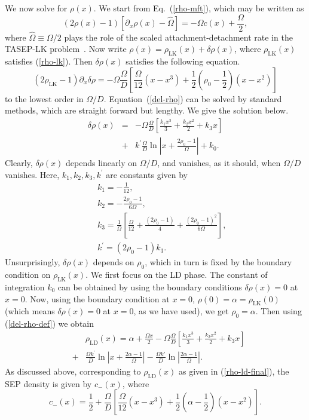 \documentclass[aps,pre,twocolumn,superscriptaddress,amsmath,amssymb,longbibliography,floatfix,nofootinbib]{revtex4}
\begin{document}
{We now solve for $\rho(x)$. We start from Eq.~(\ref{rho-mft}), which may be written as 
\begin{equation}
 (2\rho(x)-1)[{\partial}_x\rho(x)-\hat\Omega]=-\Omega c(x) +\frac{\Omega}{2},
\end{equation}
{ where $\hat\Omega \equiv \Omega/2$ plays the role of the scaled attachment-detachment rate in the TASEP-LK problem~\cite{frey-lktasep}}. Now write $\rho(x)=\rho_\text{LK}(x)+\delta\rho(x)$, where $\rho_\text{LK}(x)$ satisfies (\ref{rho-lk}). Then $\delta\rho(x)$ satisfies the following equation.
\begin{equation}
(2\rho_\text{LK}-1){\partial}_x\delta\rho=-\Omega\frac{\Omega}{D} \left[\frac{\Omega}{12}(x-x^3)+\frac{1}{2}(\rho_0-\frac{1}{2})(x-x^2)\right] \label{del-rho}
\end{equation}
to the lowest order in $\Omega/D$. Equation~(\ref{del-rho}) can be solved by standard methods, which are straight forward but lengthy. We give the solution below.
\begin{eqnarray}
 \delta\rho(x)&=&-\Omega\frac{\Omega}{D}\left[\frac{k_1x^3}{3}+\frac{k_2x^2}{2}+k_3x\right]\nonumber \\&+&k^\prime\frac{\Omega}{D}\ln \left|x+\frac{2\rho_0-1}{\Omega}\right| + k_0.\label{delta-rho-basic}
\end{eqnarray}
Clearly, $\delta\rho(x)$ depends linearly on $\Omega/D$, and vanishes, as it should, when $\Omega/D$ vanishes. Here, $k_1,k_2,k_3,k^\prime$ are constants given by
\begin{eqnarray}
 &&k_1=-\frac{1}{12},\\
 &&k_2=-\frac{2\rho_0-1}{6\Omega},\\
 &&k_3=\frac{1}{\Omega} \left[\frac{\Omega}{12}+\frac{(2\rho_0-1)}{4}+\frac{(2\rho_0-1)^2}{6\Omega}\right],\\
 &&k^\prime=(2\rho_0-1)k_3.
\end{eqnarray}
Unsurprisingly, $\delta \rho(x)$ depends on $\rho_0$, which in turn is fixed by the boundary condition on $\rho_\text{LK}(x)$. We first focus on the LD phase. The constant of integration $k_0$ can be obtained by using the boundary conditions  $\delta\rho(x)=0$ at $x=0$. Now,
using the boundary condition at $x=0$, $\rho(0)=\alpha=\rho_\text{LK}(0)$ (which means $\delta\rho(x)=0$ at $x=0$, as we have used), we get $\rho_0=\alpha$. Then using (\ref{del-rho-def}) we obtain
\begin{eqnarray}
 &&\rho_\text{LD}(x)=\alpha +\frac{\Omega x}{2}-\Omega\frac{\Omega}{D}\left[\frac{k_1x^3}{3}+\frac{k_2x^2}{2}+k_3x \right]\nonumber \\&+&\frac{\Omega k^\prime}{D}\ln \left|x+\frac{2\alpha-1}{\Omega}\right|-\frac{\Omega k'}{D}\ln \left|\frac{2\alpha-1}{\Omega}\right|.\label{rho-ld-final}
 \end{eqnarray}
 As discussed above, corresponding to $\rho_\text{LD}(x)$ as given in (\ref{rho-ld-final}), the SEP density is given by $c_-(x)$, where
\begin{equation}
 c_-(x)= \frac{1}{2} + \frac{\Omega}{D}\left[\frac{\Omega}{12}(x-x^3)+\frac{1}{2}(\alpha-\frac{1}{2})(x-x^2)\right].\label{c-minus}
\end{equation}

}
\end{document}
